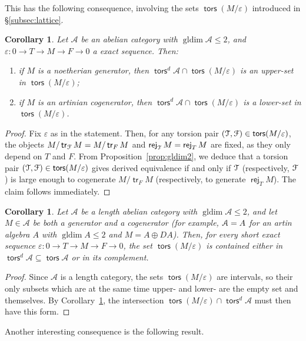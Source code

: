 \documentclass[a4paper,11pt]{amsart}
\theoremstyle{plain}
\newtheorem{cor}[thm]{Corollary}
\theoremstyle{definition}
\newcommand{\Acal}{\mathcal{A}} \newcommand{\Bcal}{\mathcal{B}} \newcommand{\Ccal}{\mathcal{C}}
\renewcommand{\epsilon}{\varepsilon}
\DeclareMathOperator{\gldim}{gldim}
\DeclareMathOperator{\tr}{\mathsf{tr}}
\DeclareMathOperator{\rej}{\mathsf{rej}}
\DeclareMathOperator{\tors}{\mathsf{tors}}
\let\mod\relax
\DeclareMathOperator{\mod}{\mathsf{mod}}
\begin{document}
This has the following consequence, involving the sets $\tors(M/\epsilon)$
introduced in \S\ref{subsec:lattice}.

\begin{cor}\label{cor:upper-lower}
	Let $\Acal$ be an abelian category with $\gldim\Acal\leq2$, and
	$\epsilon\colon 0\to T\to M\to F\to 0$ a exact sequence. Then:
	\begin{enumerate}
		\item if $M$ is a noetherian generator, then
			$\tors^d\Acal\cap\tors(M/\epsilon)$ is an upper-set in
			$\tors(M/\epsilon)$;
		\item if $M$ is an artinian cogenerator, then
			$\tors^d\Acal\cap\tors(M/\epsilon)$ is a lower-set in
			$\tors(M/\epsilon)$.
	\end{enumerate}
\end{cor}

\begin{proof}
	Fix $\varepsilon$ as in the statement. Then, for any torsion pair
	$(\Tcal,\Fcal)\in\tors(M/\epsilon)$, the objects $M/\tr_\Fcal M=M/\tr_F M$ and
	$\rej_\Tcal M=\rej_T M$
	are fixed, as they only depend on $T$ and $F$. From
	Proposition~\ref{prop:gldim2}, we deduce
	that a torsion pair $(\Tcal,\Fcal)\in\tors(M/\epsilon)$ gives derived
	equivalence if and only if $\mathcal{T}$ (respectively, $\mathcal{F}$) is large enough to
	cogenerate $M/\tr_FM$ (respectively, to generate $\rej_TM$). The claim follows
	immediately.
\end{proof}

\begin{cor}\label{cor:derived-partition}
	Let $\Acal$ be a length abelian category with $\gldim\Acal\leq 2$, and let
	$M\in\Acal$ be both a generator and a cogenerator (for example, $\Acal=\mod A$
	for an artin algebra $A$ with $\gldim A\leq 2$ and $M=A\oplus DA$).
	Then, for every short exact
	sequence $\epsilon\colon 0\to T\to M\to F\to 0$, the set $\tors(M/\epsilon)$
	is contained either in $\tors^d\Acal\subseteq\tors\Acal$ or in its complement.
\end{cor}

\begin{proof}
	Since $\Acal$ is a length category, the sets $\tors(M/\epsilon)$ are
	intervals, so their only subsets which are at the same time upper- and lower-
	are the empty set and themselves. By Corollary~\ref{cor:upper-lower}, the
	intersection $\tors(M/\epsilon)\cap\tors^d\Acal$ must then have this form.
\end{proof}

Another interesting consequence is the following result.
\end{document}
